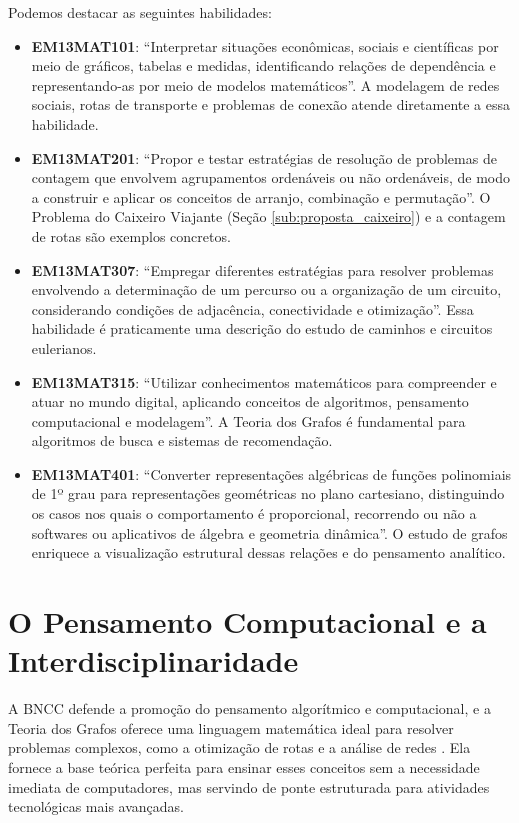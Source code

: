 \documentclass[
  12pt,
  oneside,
  a4paper,
  english,
  brazilian
  ]{abntex2}
\theoremstyle{definition}
\begin{document}
Podemos destacar as seguintes habilidades:

\begin{itemize}
  \item \textbf{EM13MAT101}: ``Interpretar situações econômicas, sociais e científicas por meio de gráficos, tabelas e medidas, identificando relações de dependência e representando-as por meio de modelos matemáticos''. A modelagem de redes sociais, rotas de transporte e problemas de conexão atende diretamente a essa habilidade.
  \item \textbf{EM13MAT201}: ``Propor e testar estratégias de resolução de problemas de contagem que envolvem agrupamentos ordenáveis ou não ordenáveis, de modo a construir e aplicar os conceitos de arranjo, combinação e permutação''. O Problema do Caixeiro Viajante (Seção \ref{sub:proposta_caixeiro}) e a contagem de rotas são exemplos concretos. 
  \item \textbf{EM13MAT307}: ``Empregar diferentes estratégias para resolver problemas envolvendo a determinação de um percurso ou a organização de um circuito, considerando condições de adjacência, conectividade e otimização''. Essa habilidade é praticamente uma descrição do estudo de caminhos e circuitos eulerianos.
  \item \textbf{EM13MAT315}: ``Utilizar conhecimentos matemáticos para compreender e atuar no mundo digital, aplicando conceitos de algoritmos, pensamento computacional e modelagem''. A Teoria dos Grafos é fundamental para algoritmos de busca e sistemas de recomendação.
  \item \textbf{EM13MAT401}: ``Converter representações algébricas de funções polinomiais de 1º grau para representações geométricas no plano cartesiano, distinguindo os casos nos quais o comportamento é proporcional, recorrendo ou não a softwares ou aplicativos de álgebra e geometria dinâmica''. O estudo de grafos enriquece a visualização estrutural dessas relações e do pensamento analítico.
\end{itemize}

\section{O Pensamento Computacional e a Interdisciplinaridade}
\label{sec:interdisciplinaridade}

A BNCC defende a promoção do pensamento algorítmico e computacional, e a Teoria dos Grafos oferece uma linguagem matemática ideal para resolver problemas complexos, como a otimização de rotas e a análise de redes \cite{lima2022}. Ela fornece a base teórica perfeita para ensinar esses conceitos sem a necessidade imediata de computadores, mas servindo de ponte estruturada para atividades tecnológicas mais avançadas.
\end{document}

